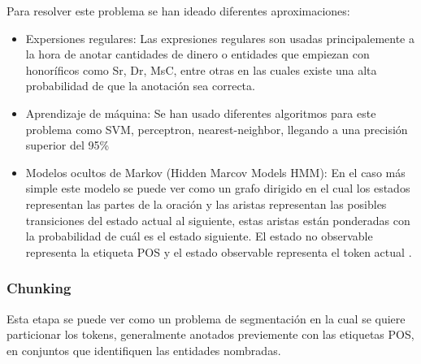 \documentclass[runningheads]{llncs}
\begin{document}
Para resolver este problema se han ideado diferentes aproximaciones:

\begin{itemize}

\item Expersiones regulares: Las expresiones regulares son usadas principalemente a la hora de anotar cantidades de dinero o entidades que empiezan con honoríficos como Sr, Dr, MsC, entre otras en las cuales existe una alta probabilidad de que la anotación sea correcta.

\item Aprendizaje de máquina: Se han usado diferentes algoritmos para este problema como SVM, perceptron, nearest-neighbor, llegando a una precisión superior del 95\% \cite{postag}

\item Modelos ocultos de Markov (Hidden Marcov Models HMM): En el caso más simple este modelo se puede ver como un grafo dirigido en el cual los estados representan las partes de la oración y las aristas representan las posibles transiciones del estado actual al siguiente, estas aristas están ponderadas con la probabilidad de cuál es el estado siguiente. El estado no observable representa la etiqueta POS y el estado observable representa el token actual \cite{hmm}.

\end{itemize}

\subsubsection{Chunking}

%


Esta etapa se puede ver como un problema de segmentación en la cual se quiere particionar los tokens, generalmente anotados previemente con las etiquetas POS, en conjuntos que identifiquen las entidades nombradas.
\end{document}
